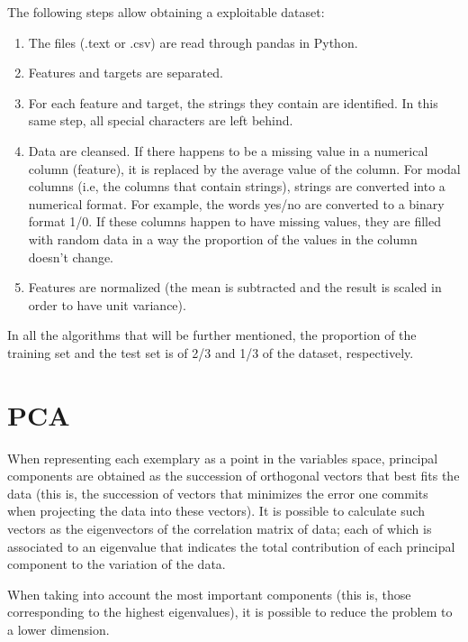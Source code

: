 \documentclass[11pt,a4paper]{article}
\begin{document}
The following steps allow obtaining a exploitable dataset: 
\begin{enumerate}
    \item The files (.text or .csv) are read through pandas in Python. 
    \item Features and targets are separated. 
    \item For each feature and target, the strings they contain are identified. In this same step, all special characters are left behind. 
    \item Data are cleansed. If there happens to be a missing value in a numerical column (feature), it is replaced by the average value of the column. For modal columns (i.e, the columns that contain strings), strings are converted into a numerical format. For example, the words yes/no are converted to a binary format 1/0. If these columns happen to have missing values, they are filled with random data in a way the proportion of the values in the column doesn't change. 
    \item Features are normalized (the mean is subtracted and the result is scaled in order to have unit variance). 
    
\end{enumerate}
In all the algorithms that will be further mentioned, the proportion of the training set and the test set is of 2/3 and 1/3 of the dataset, respectively. 

\section{PCA}
 When representing each exemplary as a point in the variables space, principal components are obtained as the succession of orthogonal vectors that best fits the data (this is, the succession of vectors that minimizes the error one commits when projecting the data into these vectors). It is possible to calculate such vectors as the eigenvectors of the correlation matrix of data; each of which is associated to an eigenvalue that indicates the total contribution of each principal component to the variation of the data. 

When taking into account the most important components (this is, those corresponding to the highest eigenvalues), it is possible to reduce the problem to a lower dimension. 
\end{document}

